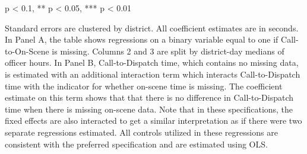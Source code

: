 \begin{table}[H]
\begin{threeparttable}
\begin{tablenotes}
\item * p < 0.1, ** p < 0.05, *** p < 0.01
\item Standard errors are clustered by district. All coefficient                      estimates are in seconds. In Panel A,                      the table shows regressions on a binary variable equal to                      one if Call-to-On-Scene is missing. Columns 2 and 3 are split by                      district-day medians of officer hours. In Panel B, Call-to-Dispatch                      time, which contains no missing data, is estimated with an additional interaction term                      which interacts Call-to-Dispatch time with the indicator for whether                      on-scene time is missing. The coefficient estimate on this term shows that                      that there is no difference in Call-to-Dispatch time when there is                       missing on-scene data. Note that in these specifications, the fixed effects                      are also interacted to get a similar interpretation as if there were two separate                      regressions estimated. All controls utilized in these regressions                      are consistent with the preferred specification and are estimated                      using OLS.                  
\end{tablenotes}
\end{threeparttable}
\end{table}
